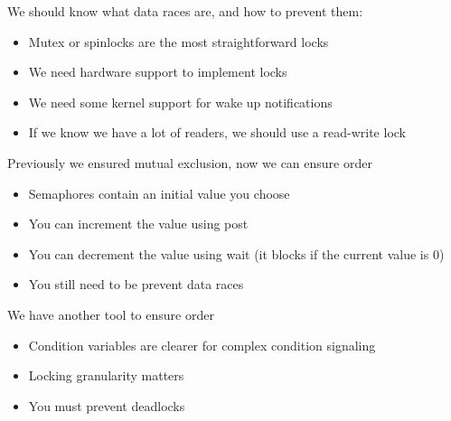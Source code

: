   \begin{slide}

    We should know what data races are, and how to prevent them:
    \begin{itemize}
      \item Mutex or spinlocks are the most straightforward locks
      \item We need hardware support to implement locks
      \item We need some kernel support for wake up notifications
      \item If we know we have a lot of readers, we should use a read-write lock
    \end{itemize}
  \end{slide}

  \begin{slide}


    Previously we ensured mutual exclusion, now we can ensure order

    \begin{itemize}
      \item Semaphores contain an initial value you choose
      \item You can increment the value using post
      \item You can decrement the value using wait (it blocks if the current
            value is 0)
      \item You still need to be prevent data races
    \end{itemize}

  \end{slide}

  \begin{slide}


    We have another tool to ensure order

    \begin{itemize}
      \item Condition variables are clearer for complex condition signaling
      \item Locking granularity matters
      \item You must prevent deadlocks
    \end{itemize}

  \end{slide}

